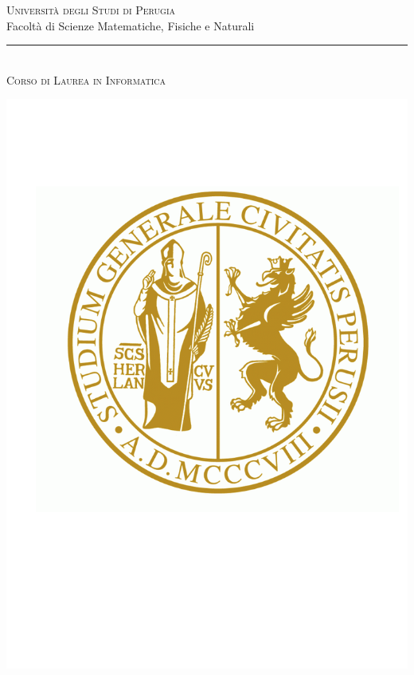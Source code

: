 \documentclass[a4paper,12pt]{report}
\title{\begin{large}\textbf{\titolotesi}\end{large}}
\author{\laureando}
\begin{document}
\begin{titlepage}
 \begin{center}
\textsc{\Large Universit\`a degli Studi di Perugia}\medskip\\

{\Large Facolt\`a di Scienze Matematiche, Fisiche e Naturali}\medskip\\

\rule{10mm}{0.01mm}\medskip\\

{\small \textsc{Corso di Laurea in Informatica}}\medskip\\


\vspace*{3mm}

\includegraphics[scale=0.35]{logounipg.png}


\end{center}
\end{titlepage}
\end{document}
